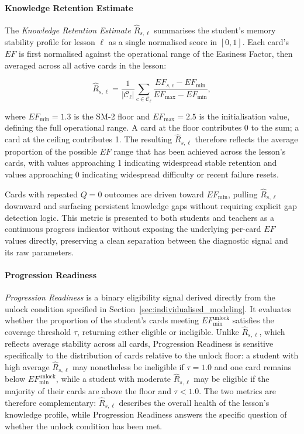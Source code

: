 \paragraph{Knowledge Retention Estimate}
The \textit{Knowledge Retention Estimate} $\hat{R}_{s,\ell}$ summarises the student's memory stability profile for lesson $\ell$ as a single normalised score in $[0, 1]$. Each card's $EF$ is first normalised against the operational range of the Easiness Factor, then averaged across all active cards in the lesson:

\begin{equation}
\hat{R}_{s,\ell} = \frac{1}{|\mathcal{C}_{\ell}|} 
\sum_{c \in \mathcal{C}_{\ell}} 
\frac{EF_{s,c} - EF_{\min}}{EF_{\max} - EF_{\min}},
\end{equation}

where $EF_{\min} = 1.3$ is the SM-2 floor and $EF_{\max} = 2.5$ is the initialisation value, defining the full operational range. A card at the floor contributes 0 to the sum; a card at the ceiling contributes 1. The resulting $\hat{R}_{s,\ell}$ therefore reflects the average proportion of the possible $EF$ range that has been achieved across the lesson's cards, with values approaching 1 indicating widespread stable retention and values approaching 0 indicating widespread difficulty or recent failure resets.

Cards with repeated $Q = 0$ outcomes are driven toward $EF_{\min}$, pulling $\hat{R}_{s,\ell}$ downward and surfacing persistent knowledge gaps without requiring explicit gap detection logic. This metric is presented to both students and teachers as a continuous progress indicator without exposing the underlying per-card $EF$ values directly, preserving a clean separation between the diagnostic signal and its raw parameters.

\paragraph{Progression Readiness}
\textit{Progression Readiness} is a binary eligibility signal derived directly from the unlock condition specified in Section~\ref{sec:individualised_modeling}. It evaluates whether the proportion of the student's cards meeting $EF_{\min}^{\text{unlock}}$ satisfies the coverage threshold $\tau$, returning either eligible or ineligible. Unlike $\hat{R}_{s,\ell}$, which reflects average stability across all cards, Progression Readiness is sensitive specifically to the distribution of cards relative to the unlock floor: a student with high average $\hat{R}_{s,\ell}$ may nonetheless be ineligible if $\tau = 1.0$ and one card remains below $EF_{\min}^{\text{unlock}}$, while a student with moderate $\hat{R}_{s,\ell}$ may be eligible if the majority of their cards are above the floor and $\tau < 1.0$. The two metrics are therefore complementary: $\hat{R}_{s,\ell}$ describes the overall health of the lesson's knowledge profile, while Progression Readiness answers the specific question of whether the unlock condition has been met.

